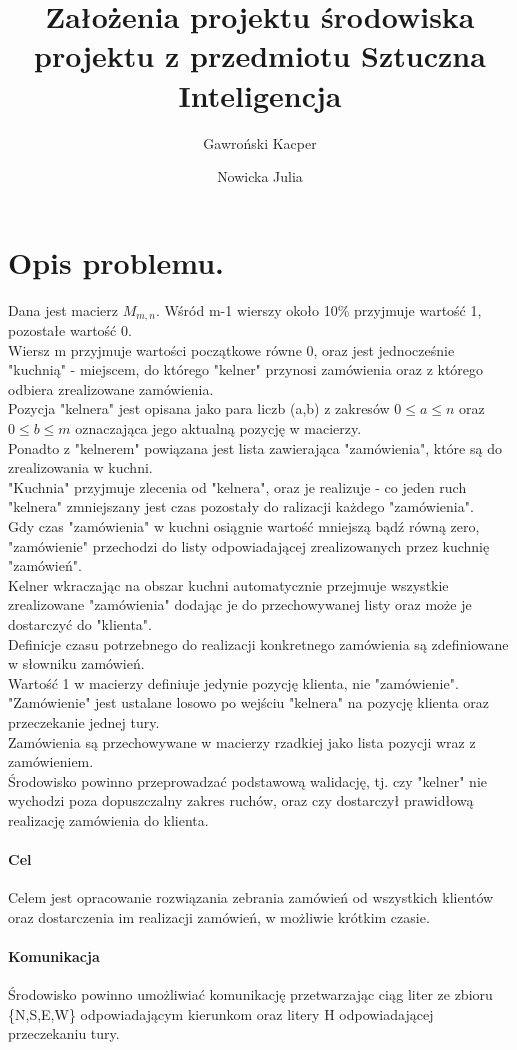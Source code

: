 \documentclass[11pt]{article}
\title{Założenia projektu środowiska projektu z przedmiotu Sztuczna Inteligencja}
\author{
  Gawroński Kacper
  \and
  Nowicka Julia
}
\begin{document}
\maketitle
\section{Opis problemu.}
Dana jest macierz $M_{m,n}$. Wśród m-1 wierszy około 10\% przyjmuje wartość 1, pozostałe wartość 0.\\
Wiersz m przyjmuje wartości początkowe równe 0, oraz jest jednocześnie "kuchnią" - miejscem, do którego "kelner" przynosi zamówienia oraz z którego odbiera zrealizowane zamówienia.\\
Pozycja "kelnera" jest opisana jako para liczb (a,b) z zakresów $0\le a \le n$ oraz $0\le b \le m$ oznaczająca jego aktualną pozycję w macierzy.\\
Ponadto z "kelnerem" powiązana jest lista zawierająca "zamówienia", które są do zrealizowania w kuchni.\\
"Kuchnia" przyjmuje zlecenia od "kelnera", oraz je realizuje - co jeden ruch "kelnera" zmniejszany jest czas pozostały do ralizacji każdego "zamówienia".\\
Gdy czas "zamówienia" w kuchni osiągnie wartość mniejszą bądź równą zero, "zamówienie" przechodzi do listy odpowiadającej zrealizowanych przez kuchnię "zamówień".\\
Kelner wkraczając na obszar kuchni automatycznie przejmuje wszystkie zrealizowane "zamówienia" dodając je do przechowywanej listy oraz może je dostarczyć do "klienta".\\
Definicje czasu potrzebnego do realizacji konkretnego zamówienia są zdefiniowane w słowniku zamówień.\\
Wartość 1 w macierzy definiuje jedynie pozycję klienta, nie "zamówienie". "Zamówienie" jest ustalane losowo po wejściu "kelnera" na pozycję klienta oraz przeczekanie jednej tury.\\
Zamówienia są przechowywane w macierzy rzadkiej jako lista pozycji wraz z zamówieniem.\\
Środowisko powinno przeprowadzać podstawową walidację, tj. czy "kelner" nie wychodzi poza dopuszczalny zakres ruchów, oraz czy dostarczył prawidłową realizację zamówienia do klienta.\\
\paragraph{Cel}
Celem jest opracowanie rozwiązania zebrania zamówień od wszystkich klientów oraz dostarczenia im realizacji zamówień, w możliwie krótkim czasie.
\paragraph{Komunikacja}
Środowisko powinno umożliwiać komunikację przetwarzając ciąg liter ze zbioru \{N,S,E,W\} odpowiadającym kierunkom oraz litery H odpowiadającej przeczekaniu tury.\\
\end{document}

